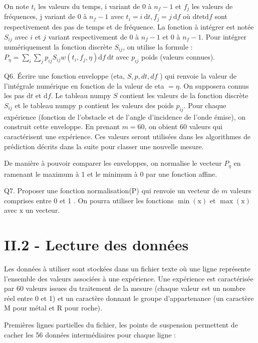 \documentclass[10pt]{article}
\begin{document}
On note $t_{i}$ les valeurs du temps, i variant de 0 à $n_{f}-1$ et $f_{j}$ les valeurs de fréquences, $\mathrm{j}$ variant de 0 à $n_{f}-1$ avec $t_{i}=i \mathrm{~d} t, f_{j}=j \mathrm{~d} f$ où $\mathrm{d} t \mathrm{et} \mathrm{d} f$ sont respectivement des pas de temps et de fréquence. La fonction à intégrer est notée $S_{i j}$ avec $i$ et $j$ variant respectivement de 0 à $n_{f}-1$ et 0 à $n_{f}-1$. Pour intégrer numériquement la fonction discrète $S_{i j}$, on utilise la formule : $P_{\eta}=\sum_{i} \sum_{j} p_{i j} S_{i j} w\left(t_{i}, f_{j}, \eta\right) \mathrm{d} f \mathrm{~d} t$ avec $p_{i j}$ poids (valeurs connues).

Q6. Écrire une fonction enveloppe (eta, $S, p, d t, d f$ ) qui renvoie la valeur de l'intégrale numérique en fonction de la valeur de eta $=\eta$. On supposera connus les pas $\mathrm{d} t$ et $\mathrm{d} f$. Le tableau numpy $S$ contient les valeurs de la fonction discrète $S_{i j}$ et le tableau numpy $\mathrm{p}$ contient les valeurs des poids $p_{i j}$. Pour chaque expérience (fonction de l'obstacle et de l'angle d'incidence de l'onde émise), on construit cette enveloppe. En prenant $m=60$, on obient 60 valeurs qui caractérisent une expérience. Ces valeurs seront utilisées dans les algorithmes de prédiction décrits dans la suite pour classer une nouvelle mesure.

De manière à pouvoir comparer les enveloppes, on normalise le vecteur $P_{\eta}$ en ramenant le maximum à 1 et le minimum à 0 par une fonction affine.

Q7. Proposer une fonction normalisation(P) qui renvoie un vecteur de $m$ valeurs comprises entre 0 et 1 . On pourra utiliser les fonctions $\min (\mathrm{x})$ et $\max (\mathrm{x})$ avec $\mathrm{x}$ un vecteur.

\section{II.2 - Lecture des données}
Les données à utiliser sont stockées dans un fichier texte où une ligne représente l'ensemble des valeurs associées à une expérience. Une expérience est caractérisée par 60 valeurs issues du traitement de la mesure (chaque valeur est un nombre réel entre 0 et 1) et un caractère donnant le groupe d'appartenance (un caractère $\mathrm{M}$ pour métal et $\mathrm{R}$ pour roche).

Premières lignes partielles du fichier, les points de suspension permettent de cacher les 56 données intermédiaires pour chaque ligne :
\end{document}
